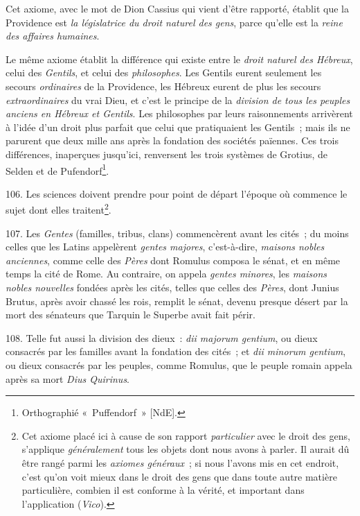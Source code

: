 \documentclass[french,twoside]{book} %
\begin{document}
Cet axiome, avec le mot de Dion Cassius qui vient d’être rapporté, établit que la Providence est {\itshape la législatrice du droit naturel des gens}, parce qu’elle est la {\itshape reine des affaires humaines}.\par
Le même axiome établit la différence qui existe entre le {\itshape droit naturel des Hébreux}, celui des {\itshape Gentils}, et celui des {\itshape philosophes}. Les Gentils eurent seulement les secours {\itshape ordinaires} de la Providence, les Hébreux eurent de plus les secours {\itshape extraordinaires} du vrai Dieu, et c’est le principe de la {\itshape division de tous les peuples anciens en Hébreux et Gentils}. Les philosophes par leurs raisonnements arrivèrent à l’idée d’un droit plus parfait que celui que pratiquaient les Gentils ; mais ils ne parurent que  deux mille ans après la fondation des sociétés païennes. Ces trois différences, inaperçues jusqu’ici, renversent les trois systèmes de Grotius, de Selden et de Pufendorf\footnote{Orthographié « Puffendorf » [NdE].}.\par
106. Les sciences doivent prendre pour point de départ l’époque où commence le sujet dont elles traitent\footnote{Cet axiome placé ici à cause de son rapport {\itshape particulier} avec le droit des gens, s’applique {\itshape généralement} tous les objets dont nous avons à parler. Il aurait dû être rangé parmi les {\itshape axiomes généraux} ; si nous l’avons mis en cet endroit, c’est qu’on voit mieux dans le droit des gens que dans toute autre matière particulière, combien il est conforme à la vérité, et important dans l’application ({\itshape Vico}).}.\par
107. Les {\itshape Gentes} (familles, tribus, clans) commencèrent avant les cités ; du moins celles que les Latins appelèrent {\itshape gentes majores}, c’est-à-dire, {\itshape maisons nobles anciennes}, comme celle des {\itshape Pères} dont Romulus composa le sénat, et en même temps la cité de Rome. Au contraire, on appela {\itshape gentes minores}, les {\itshape maisons nobles nouvelles} fondées après les cités, telles que celles des {\itshape Pères}, dont Junius Brutus, après avoir chassé les rois, remplit le sénat, devenu presque désert par la mort des sénateurs que Tarquin le Superbe avait fait périr.\par
108. Telle fut aussi la division des dieux : {\itshape dii majorum gentium}, ou dieux consacrés par les familles avant la fondation des cités ; et {\itshape dii minorum gentium}, ou dieux consacrés par les peuples, comme  Romulus, que le peuple romain appela après sa mort {\itshape Dius Quirinus}.\par
\end{document}
